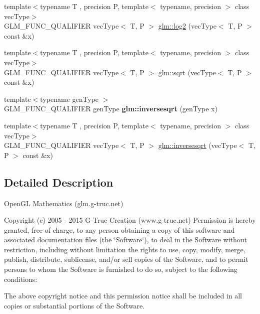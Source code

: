 \begin{DoxyCompactItemize}
\item 
{\footnotesize template$<$typename T , precision P, template$<$ typename, precision $>$ class vec\-Type$>$ }\\G\-L\-M\-\_\-\-F\-U\-N\-C\-\_\-\-Q\-U\-A\-L\-I\-F\-I\-E\-R vec\-Type$<$ T, P $>$ \hyperlink{group__core__func__exponential_gabae30945338a555a03733f00dad95d0d}{glm\-::log2} (vec\-Type$<$ T, P $>$ const \&x)
\item 
{\footnotesize template$<$typename T , precision P, template$<$ typename, precision $>$ class vec\-Type$>$ }\\G\-L\-M\-\_\-\-F\-U\-N\-C\-\_\-\-Q\-U\-A\-L\-I\-F\-I\-E\-R vec\-Type$<$ T, P $>$ \hyperlink{group__core__func__exponential_gae7ac2e44c14d4e8004098d0bfba6e2b8}{glm\-::sqrt} (vec\-Type$<$ T, P $>$ const \&x)
\item 
\hypertarget{namespaceglm_a5e3dd2bba414db15477d43ca9d71acf5}{{\footnotesize template$<$typename gen\-Type $>$ }\\G\-L\-M\-\_\-\-F\-U\-N\-C\-\_\-\-Q\-U\-A\-L\-I\-F\-I\-E\-R gen\-Type {\bfseries glm\-::inversesqrt} (gen\-Type x)}\label{namespaceglm_a5e3dd2bba414db15477d43ca9d71acf5}

\item 
{\footnotesize template$<$typename T , precision P, template$<$ typename, precision $>$ class vec\-Type$>$ }\\G\-L\-M\-\_\-\-F\-U\-N\-C\-\_\-\-Q\-U\-A\-L\-I\-F\-I\-E\-R vec\-Type$<$ T, P $>$ \hyperlink{group__core__func__exponential_ga599103d4fe4ef2234761ba8da7268627}{glm\-::inversesqrt} (vec\-Type$<$ T, P $>$ const \&x)
\end{DoxyCompactItemize}


\subsection{Detailed Description}
Open\-G\-L Mathematics (glm.\-g-\/truc.\-net)

Copyright (c) 2005 -\/ 2015 G-\/\-Truc Creation (www.\-g-\/truc.\-net) Permission is hereby granted, free of charge, to any person obtaining a copy of this software and associated documentation files (the \char`\"{}\-Software\char`\"{}), to deal in the Software without restriction, including without limitation the rights to use, copy, modify, merge, publish, distribute, sublicense, and/or sell copies of the Software, and to permit persons to whom the Software is furnished to do so, subject to the following conditions\-:

The above copyright notice and this permission notice shall be included in all copies or substantial portions of the Software.

